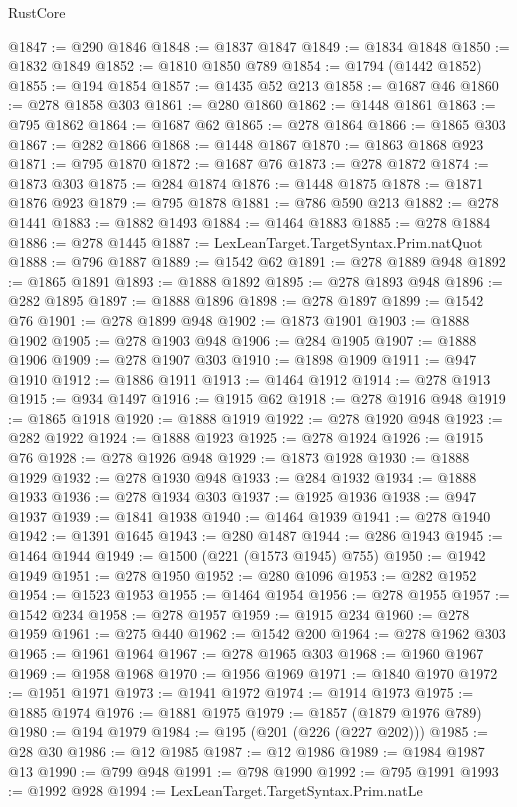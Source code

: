 \begin{lexlean}{RustCore}
\begin{coremodule}
@1847 := @290 @1846
@1848 := @1837 @1847
@1849 := @1834 @1848
@1850 := @1832 @1849
@1852 := @1810 @1850 @789
@1854 := @1794 (@1442 @1852)
@1855 := @194 @1854
@1857 := @1435 @52 @213
@1858 := @1687 @46
@1860 := @278 @1858 @303
@1861 := @280 @1860
@1862 := @1448 @1861
@1863 := @795 @1862
@1864 := @1687 @62
@1865 := @278 @1864
@1866 := @1865 @303
@1867 := @282 @1866
@1868 := @1448 @1867
@1870 := @1863 @1868 @923
@1871 := @795 @1870
@1872 := @1687 @76
@1873 := @278 @1872
@1874 := @1873 @303
@1875 := @284 @1874
@1876 := @1448 @1875
@1878 := @1871 @1876 @923
@1879 := @795 @1878
@1881 := @786 @590 @213
@1882 := @278 @1441
@1883 := @1882 @1493
@1884 := @1464 @1883
@1885 := @278 @1884
@1886 := @278 @1445
@1887 := LexLeanTarget.TargetSyntax.Prim.natQuot
@1888 := @796 @1887
@1889 := @1542 @62
@1891 := @278 @1889 @948
@1892 := @1865 @1891
@1893 := @1888 @1892
@1895 := @278 @1893 @948
@1896 := @282 @1895
@1897 := @1888 @1896
@1898 := @278 @1897
@1899 := @1542 @76
@1901 := @278 @1899 @948
@1902 := @1873 @1901
@1903 := @1888 @1902
@1905 := @278 @1903 @948
@1906 := @284 @1905
@1907 := @1888 @1906
@1909 := @278 @1907 @303
@1910 := @1898 @1909
@1911 := @947 @1910
@1912 := @1886 @1911
@1913 := @1464 @1912
@1914 := @278 @1913
@1915 := @934 @1497
@1916 := @1915 @62
@1918 := @278 @1916 @948
@1919 := @1865 @1918
@1920 := @1888 @1919
@1922 := @278 @1920 @948
@1923 := @282 @1922
@1924 := @1888 @1923
@1925 := @278 @1924
@1926 := @1915 @76
@1928 := @278 @1926 @948
@1929 := @1873 @1928
@1930 := @1888 @1929
@1932 := @278 @1930 @948
@1933 := @284 @1932
@1934 := @1888 @1933
@1936 := @278 @1934 @303
@1937 := @1925 @1936
@1938 := @947 @1937
@1939 := @1841 @1938
@1940 := @1464 @1939
@1941 := @278 @1940
@1942 := @1391 @1645
@1943 := @280 @1487
@1944 := @286 @1943
@1945 := @1464 @1944
@1949 := @1500 (@221 (@1573 @1945) @755)
@1950 := @1942 @1949
@1951 := @278 @1950
@1952 := @280 @1096
@1953 := @282 @1952
@1954 := @1523 @1953
@1955 := @1464 @1954
@1956 := @278 @1955
@1957 := @1542 @234
@1958 := @278 @1957
@1959 := @1915 @234
@1960 := @278 @1959
@1961 := @275 @440
@1962 := @1542 @200
@1964 := @278 @1962 @303
@1965 := @1961 @1964
@1967 := @278 @1965 @303
@1968 := @1960 @1967
@1969 := @1958 @1968
@1970 := @1956 @1969
@1971 := @1840 @1970
@1972 := @1951 @1971
@1973 := @1941 @1972
@1974 := @1914 @1973
@1975 := @1885 @1974
@1976 := @1881 @1975
@1979 := @1857 (@1879 @1976 @789)
@1980 := @194 @1979
@1984 := @195 (@201 (@226 (@227 @202)))
@1985 := @28 @30
@1986 := @12 @1985
@1987 := @12 @1986
@1989 := @1984 @1987 @13
@1990 := @799 @948
@1991 := @798 @1990
@1992 := @795 @1991
@1993 := @1992 @928
@1994 := LexLeanTarget.TargetSyntax.Prim.natLe

\end{coremodule}
\end{lexlean}
